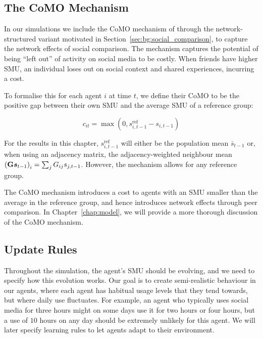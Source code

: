 \subsection{The CoMO Mechanism}
\label{sec:abm:como}
In our simulations we include the CoMO mechanism of \textcite[Eqs.~1--2]{DahlFoldnesGronneberg2024} through the network-structured variant motivated in Section~\ref{sec:bg:social_comparison}, to capture the network effects of social comparison. The mechanism captures the potential of being ``left out'' of activity on social media to be costly. When friends have higher SMU, an individual loses out on social context and shared experiences, incurring a cost.

To formalise this for each agent $i$ at time $t$, we define their CoMO to be the positive gap between their own SMU and the average SMU of a reference group:

\begin{equation}
    c_{it} = \max\left(0, s_{i,t-1}^{\text{ref}} - s_{i,t-1}\right)
    \label{eq:como_main}
\end{equation}

For the results in this chapter, $s_{i,t-1}^{\text{ref}}$ will either be the population mean $\bar{s}_{t-1}$ or, when using an adjacency matrix, the adjacency-weighted neighbour mean ${(\mathbf{G}\bm{s}_{t-1})}_i = \sum_j G_{ij} s_{j,t-1}$. However, the mechanism allows for any reference group.

The CoMO mechanism introduces a cost to agents with an SMU smaller than the average in the reference group, and hence introduces network effects through peer comparison. In Chapter~\ref{chap:model}, we will provide a more thorough discussion of the CoMO mechanism.

\subsection{Update Rules}
\label{sec:abm:smu_dynamics}
Throughout the simulation, the agent's SMU should be evolving, and we need to specify how this evolution works. Our goal is to create semi-realistic behaviour in our agents, where each agent has habitual usage levels that they tend towards, but where daily use fluctuates. For example, an agent who typically uses social media for three hours might on some days use it for two hours or four hours, but a use of $10$ hours on any day should be extremely unlikely for this agent. We will later specify learning rules to let agents adapt to their environment.

